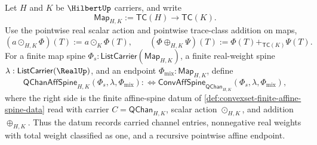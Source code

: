\begin{definition}
\label{def:quantumchannel-affine-mixture-spine}
Let $H$ and $K$ be $\HilbertUp$ carriers, and write
$$
\mathsf{Map}_{H,K}:=\mathsf{TC}(H)\to\mathsf{TC}(K).
$$
Use the pointwise real scalar action and pointwise trace-class addition on maps,
$$
(a\odot_{H,K}\Phi)(T):=a\odot_K\Phi(T),
\qquad
(\Phi\oplus_{H,K}\Psi)(T):=\Phi(T)+_{\mathsf{TC}(K)}\Psi(T).
$$
For a finite map spine $\Phi_s:\mathsf{ListCarrier}(\mathsf{Map}_{H,K})$, a finite real-weight spine $\lambda:\mathsf{ListCarrier}(\RealUp)$, and an endpoint $\Phi_{\mathrm{mix}}:\mathsf{Map}_{H,K}$, define
$$
\mathsf{QChanAffSpine}_{H,K}(\Phi_s,\lambda,\Phi_{\mathrm{mix}})
:\Longleftrightarrow
\mathsf{ConvAffSpine}_{\mathsf{QChan}_{H,K}}(\Phi_s,\lambda,\Phi_{\mathrm{mix}}),
$$
where the right side is the finite affine-spine datum of \autoref{def:convexset-finite-affine-spine-data} read with carrier $C=\mathsf{QChan}_{H,K}$, scalar action $\odot_{H,K}$, and addition $\oplus_{H,K}$. Thus the datum records carried channel entries, nonnegative real weights with total weight classified as one, and a recursive pointwise affine endpoint.
\end{definition}

